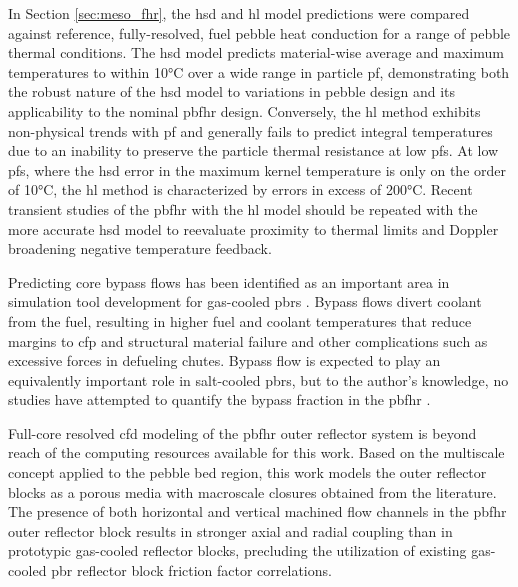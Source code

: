In Section \ref{sec:meso_fhr}, the \gls{hsd} and \gls{hl} model predictions were compared against reference, fully-resolved, fuel pebble heat conduction for a range of pebble thermal conditions. The \gls{hsd} model predicts material-wise average and maximum temperatures to within 10\si{\celsius} over a wide range in particle \gls{pf}, demonstrating both the robust nature of the \gls{hsd} model to variations in pebble design and its applicability to the nominal \gls{pbfhr} design. Conversely, the \gls{hl} method exhibits non-physical trends with \gls{pf} and generally fails to predict integral temperatures due to an inability to preserve the particle thermal resistance at low \glspl{pf}. At low \glspl{pf}, where the \gls{hsd} error in the maximum kernel temperature is only on the order of 10\si{\celsius}, the \gls{hl} method is characterized by errors in excess of 200\si{\celsius}. Recent transient studies of the \gls{pbfhr} with the \gls{hl} model \cite{xin_wang_thesis} should be repeated with the more accurate \gls{hsd} model to reevaluate proximity to thermal limits and Doppler broadening negative temperature feedback.

Predicting core bypass flows has been identified as an important area in simulation tool development for gas-cooled \glspl{pbr} \cite{gou_2018}. Bypass flows divert coolant from the fuel, resulting in higher fuel and coolant temperatures that reduce margins to \gls{cfp} and structural material failure and other complications such as excessive forces in defueling chutes. Bypass flow is expected to play an equivalently important role in salt-cooled \glspl{pbr}, but to the author's knowledge, no studies have attempted to quantify the bypass fraction in the \gls{pbfhr} \cite{pbfhr_website}.

Full-core resolved \gls{cfd} modeling of the \gls{pbfhr} outer reflector system is beyond reach of the computing resources available for this work. Based on the multiscale concept applied to the pebble bed region, this work models the outer reflector blocks as a porous media with macroscale closures obtained from the literature. The presence of both horizontal and vertical machined flow channels in the \gls{pbfhr} outer reflector block results in stronger axial and radial coupling than in prototypic gas-cooled reflector blocks, precluding the utilization of existing gas-cooled \gls{pbr} reflector block friction factor correlations. 


